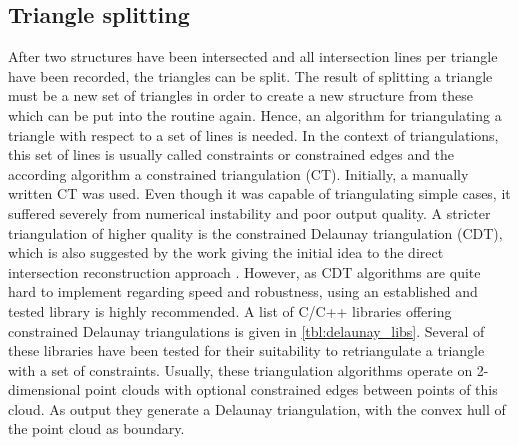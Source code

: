 \subsection{Triangle splitting}
\label{sec:triangle_splitting}

After two structures have been intersected and all intersection lines per triangle have been recorded, the triangles can be split.
The result of splitting a triangle must be a new set of triangles in order to create a new structure from these which can be put into the  routine again.
Hence, an algorithm for triangulating a triangle with respect to a set of lines is needed.
In the context of triangulations, this set of lines is usually called constraints or constrained edges and the according algorithm a constrained triangulation (CT).
Initially, a manually written CT was used.
Even though it was capable of triangulating simple cases, it suffered severely from numerical instability and poor output quality.
A stricter triangulation of higher quality is the constrained Delaunay triangulation (CDT), which is also suggested by the work giving the initial idea to the direct intersection reconstruction approach \cite{mesh_intersection}.
However, as CDT algorithms are quite hard to implement regarding speed and robustness, using an established and tested library is highly recommended.
A list of C/C++ libraries offering constrained Delaunay triangulations is given in \cref{tbl:delaunay_libs}.
Several of these libraries have been tested for their suitability to retriangulate a triangle with a set of constraints.
Usually, these triangulation algorithms operate on 2-dimensional point clouds with optional constrained edges between points of this cloud.
As output they generate a Delaunay triangulation, with the convex hull of the point cloud as boundary.

